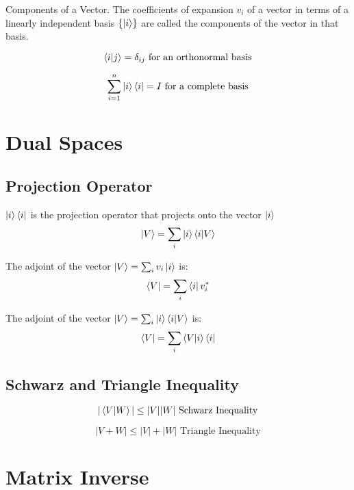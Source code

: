 \begin{definition}{Components of a Vector.}
	The coefficients of expansion $v_i$ of a vector in terms of a linearly independent basis $\{\ket{i}\}$ are called the components of the vector in that basis.
\end{definition}

\begin{equation}
	\braket{i}{j} = \delta_{ij} \text{ for an orthonormal basis}
\end{equation}

\begin{equation}
	\sum_{i=1}^n \ket{i}\bra{i} = I \text{ for a complete basis}
\end{equation}

\section{Dual Spaces}

\subsection{Projection Operator}
$\ket{i}\bra{i}$ is the projection operator that projects onto the vector $\ket{i}$
\begin{equation}
	\ket{V} = \sum_{i} \ket{i}\braket{i}{V}
\end{equation}	

The adjoint of the vector $\ket{V} = \sum_i v_i \ket{i}$ is:
\begin{equation}
	\bra{V} = \sum_i \bra{i} v_i^* 
\end{equation}

The adjoint of the vector $\ket{V} = \sum_i \ket{i}\braket{i}{V}$ is:
\begin{equation}
	\bra{V} = \sum_i \braket{V}{i}\bra{i}
\end{equation}


\subsection{Schwarz and Triangle Inequality}
\begin{equation}
	|\braket{V}{W}| \leq |V||W| \text{  Schwarz Inequality}
\end{equation}

\begin{equation}
	|V + W| \leq |V| + |W| \text{  Triangle Inequality}
\end{equation}

\section{Matrix Inverse}
